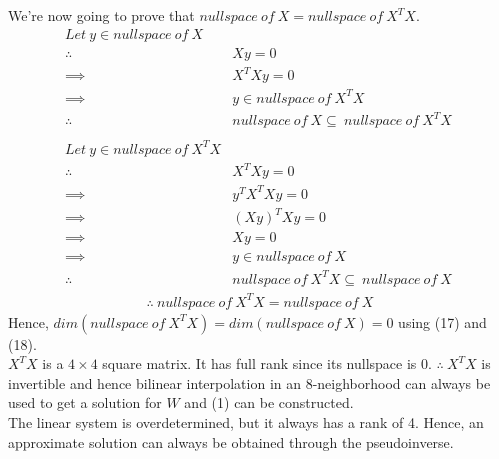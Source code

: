 \documentclass[a4paper,fleqn,11pt]{article}
\theoremstyle{mytheor}
\begin{document}
We're now going to prove that $nullspace\ of\ X = nullspace\ of\ X^TX$.
\begin{align*}
Let\ y \in nullspace\ of\ X \\
\therefore\ & Xy = 0 \\
\implies\ & X^TXy = 0 \\
\implies\ & y \in nullspace\ of\ X^TX \\
\therefore\ & nullspace\ of\ X \subseteq\ nullspace\ of\ X^TX \\
\\
Let\ y \in nullspace\ of\ X^TX \\
\therefore\ & X^TXy = 0 \\
\implies\ & y^TX^TXy = 0 \\
\implies\ & (Xy)^TXy = 0 \\
\implies\ & Xy = 0 \\
\implies\ & y \in nullspace\ of\ X \\
\therefore\ & nullspace\ of\ X^TX \subseteq\ nullspace\ of\ X\
\end{align*}
\begin{align}
\therefore\ nullspace\ of\ X^TX = nullspace\ of\ X
\end{align}
Hence, $dim(nullspace\ of\ X^TX) = dim(nullspace\ of\ X) = 0$ using (17) and (18). \\
$X^TX$ is a $4\times4$ square matrix. It has full rank since its nullspace is 0. $\therefore\ X^TX$ is invertible and hence bilinear interpolation in an 8-neighborhood can always be used to get a solution for $W$ and (1) can be constructed. \\
The linear system is overdetermined, but it always has a rank of 4. Hence, an approximate solution can always be obtained through the pseudoinverse.

\pagebreak
\end{document}
